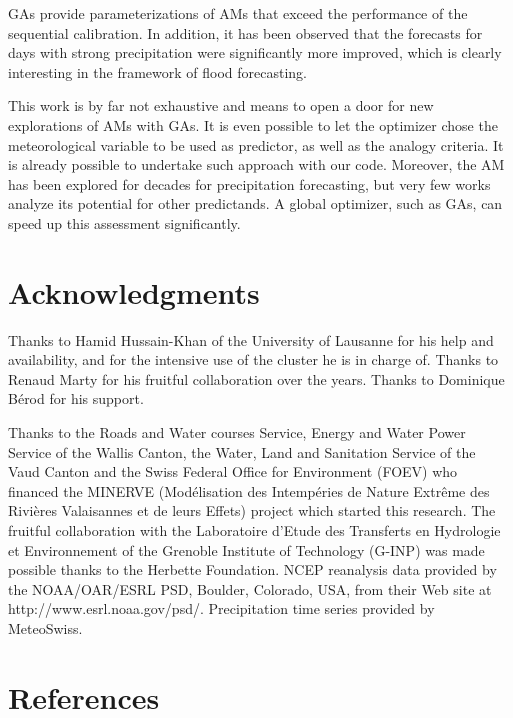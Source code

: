 \documentclass[review]{elsarticle}
\begin{document}
GAs provide parameterizations of AMs that exceed the performance of the sequential calibration. In addition, it has been observed that the forecasts for days with strong precipitation were significantly more improved, which is clearly interesting in the framework of flood forecasting.

This work is by far not exhaustive and means to open a door for new explorations of AMs with GAs. It is even possible to let the optimizer chose the meteorological variable to be used as predictor, as well as the analogy criteria. It is already possible to undertake such approach with our code. Moreover, the AM has been explored for decades for precipitation forecasting, but very few works analyze its potential for other predictands. A global optimizer, such as GAs, can speed up this assessment significantly.


\section*{Acknowledgments}
Thanks to Hamid Hussain-Khan of the University of Lausanne for his help and availability, and for the intensive use of the cluster he is in charge of. Thanks to Renaud Marty for his fruitful collaboration over the years. Thanks to Dominique B\'{e}rod for his support.

Thanks to the Roads and Water courses Service, Energy and Water Power Service of the Wallis Canton, the Water, Land and Sanitation Service of the Vaud Canton and the Swiss Federal Office for Environment (FOEV) who financed the MINERVE (Mod\'{e}lisation des Intemp\'{e}ries de Nature Extr\^{e}me des Rivi\`{e}res Valaisannes et de leurs Effets) project which started this research. The fruitful collaboration with the Laboratoire d'Etude des Transferts en Hydrologie et Environnement of the Grenoble Institute of Technology (G-INP) was made possible thanks to the Herbette Foundation. NCEP reanalysis data provided by the NOAA/OAR/ESRL PSD, Boulder, Colorado, USA, from their Web site at http://www.esrl.noaa.gov/psd/. Precipitation time series provided by MeteoSwiss. 


\section*{References}




\end{document}
